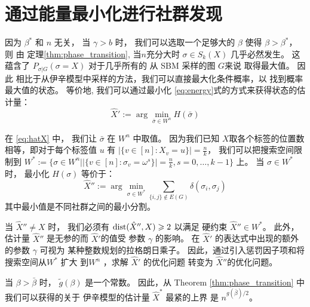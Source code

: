 \section{通过能量最小化进行社群发现}\label{sec:em}
因为 $\beta^*$ 和 $n$ 无关，
当 $\gamma>b$ 时，
我们可以选取一个足够大的 $\beta$ 使得
$\beta > \beta^*$，
则 由 定理\ref{thm:phase_transition}, 当$n$充分大时 $\sigma \in S_k(X)$ 几乎必然发生。
这蕴含了 $P_{\sigma | G}(\sigma = X)$
对于几乎所有的 从 SBM 采样的图  $G$来说 取得最大值。
因此
相比于从伊辛模型中采样的方法，我们可以直接最大化条件概率，以
找到概率最大值的状态。
等价地, 我们可以通过最小化 \eqref{eq:energy}式的方式来获得状态的估计量：
\begin{equation}\label{eq:hatX}
\hat{X}' := \arg\min_{\bar{\sigma} \in W^n} H(\bar{\sigma})
\end{equation}

在 \eqref{eq:hatX} 中， 我们让 $\bar{\sigma}$ 在 $W^n$ 中取值。
因为我们已知 $X$取各个标签的位置数相等，即对于每个标签值 $u$
有 $|\{v \in [n] : X_v = u\}| = \frac{n}{k}$，
我们可以把搜索空间限制到
$W^*:= \{\sigma\in W^n \big\vert |\{v \in [n] : \sigma_v = \omega^s\}| = \frac{n}{k}, s=0,\dots, k-1 \}$
上。
当 $\sigma \in W^*$ 时， 最小化 $H(\sigma)$ 等价于：
\begin{equation}\label{eq:hatX_double_prime}
\hat{X}'' := \arg\min_{\sigma \in W^*} \sum_{\{i,j\} \not\in E(G) } \delta(\sigma_i, \sigma_j)
\end{equation}
其中最小值是不同社群之间的最小分割。

当 $\hat{X}'' \neq X$ 时，
我们必须有  $\operatorname{dist}(\hat{X}'' ,X)\geqslant 2$
以满足 硬约束 $\hat{X}'' \in W^*$。
此外，估计量 $\hat{X}''$ 是无参的而 $\hat{X}'$的值受
参数 $\gamma$ 的影响。
在
$\hat{X}'$ 的表达式中出现的额外的参数 $\gamma$ 可视为
某种整数规划的拉格朗日乘子。
因此，通过引入惩罚因子项和将搜索空间从$W^*$ 扩大 到$W^n$
，求解 $\hat{X}'$
的优化问题 转变为 $\hat{X}''$的优化问题。

当 $\beta > \bar{\beta}$ 时，
$\tilde{g}(\beta)$ 是一个常数。
因此，从 Theorem \ref{thm:phase_transition} 中我们可以获得的关于
伊辛模型的估计量 $\hat{X}^*$ 最紧的上界
是  $n^{g(\bar{\beta})/2}$。

